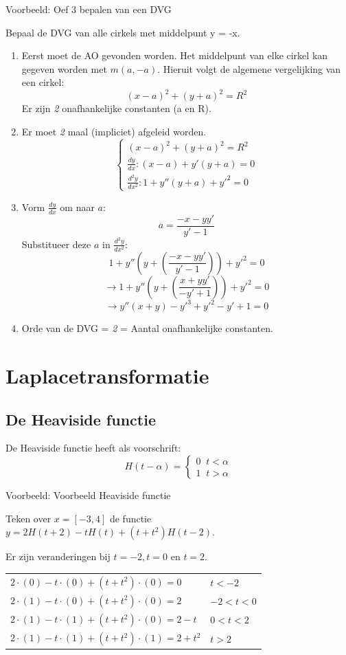 \documentclass[12pt]{report}
\newcommand{\todo}[1]{
  {\color{red}\textunderscore{\textit{TODO: #1}}}
}
\newcommand{\example}[2]{
      \hrulefill
      
      Voorbeeld: #1
      
      #2
      
      \hrulefill
}
\begin{document}
\example{Oef 3 bepalen van een DVG}
{
  Bepaal de DVG van alle cirkels met middelpunt y = -x.
  \begin{enumerate}
   \item Eerst moet de AO gevonden worden. Het middelpunt van elke cirkel kan gegeven worden met $m(a, -a).$
    Hieruit volgt de algemene vergelijking van een cirkel: $$(x - a)^2 + (y + a)^2 = R^2$$
    Er zijn \textit{2} onafhankelijke constanten (a en R).
   \item Er moet \textit{2} maal (impliciet) afgeleid worden.
   \[
      \begin{cases}
       (x - a)^2 + (y + a)^2 = R^2 \\
       \frac{dy}{dx} : (x-a) + y'(y+a) = 0 \\
       \frac{d^2y}{dx^2} : 1 + y''(y + a) + y'^2 = 0
      \end{cases}
   \]
   \item
    Vorm $\frac{dy}{dx}$ om naar $a$:
    $$a = \frac{-x - yy'}{y' - 1}$$
    Substitueer deze $a$ in $\frac{d^2y}{dx^2}$:
    $$1 + y''(y + (\frac{-x - yy'}{y' - 1})) + y'^2 = 0$$
    $$\rightarrow 1 + y''(y + (\frac{x + yy'}{-y' + 1})) + y'^2 = 0$$
    $$\rightarrow y''(x + y) - y'^3 + y'^2 - y' + 1 = 0$$
   \item Orde van de DVG = \textit{2}  = Aantal onafhankelijke constanten.
  \end{enumerate}
}


\chapter{Laplacetransformatie}
\section{De Heaviside functie}
De Heaviside functie heeft als voorschrift:
$$H(t - \alpha) = 
\begin{cases}
  0 \;\; t < \alpha \\
  1 \;\; t > \alpha
\end{cases}$$

\example{Voorbeeld Heaviside functie}
{
Teken over $x=[-3,4]$ de functie $y = 2H(t + 2) - tH(t) + (t+t^2)H(t-2)$.

Er zijn veranderingen bij $t = -2, t = 0$ en $t = 2$.

    \begin{tabular}{l | l}
    \hline
    $2\cdot(0) - t\cdot(0) + (t+t^2)\cdot(0) = 0$ & $t < -2$\\
    $2\cdot(1) - t\cdot(0) + (t+t^2)\cdot(0) = 2$ & $-2 < t < 0$  \\
    $2\cdot(1) - t\cdot(1) + (t+t^2)\cdot(0) = 2 - t$ & $0 < t < 2$\\
    $2\cdot(1) - t\cdot(1) + (t+t^2)\cdot(1) = 2 + t^2$ & $t > 2$\\
    \end{tabular}
  \todo{graph}
}
\end{document}
